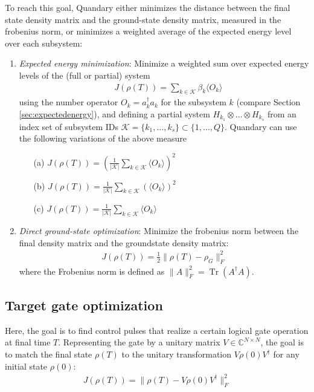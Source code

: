 \documentclass[letterpaper]{article}
\DeclareMathOperator{\Tr}{Tr}
\newcommand{\C}{\mathds{C}}
\begin{document}
To reach this goal, Quandary either minimizes the distance between the final state
density matrix and the ground-state density matrix, measured in the frobenius
norm, or minimizes a weighted average of the expected energy level over each subsystem:
\begin{enumerate}
  \item \textit{Expected energy minimization}: Minimize a weighted sum over
    expected energy levels of the (full or partial) system
    \begin{align}
       \quad J(\rho(T)) = \sum_{k\in \mathcal{K}} \beta_k \langle O_k \rangle 
    \end{align}
    using the number operator $O_k = a_k^\dag a_k$ for the subsystem $k$
    (compare Section \ref{sec:expectedenergy}), and defining a partial system
    $H_{k_1}\otimes \dots \otimes H_{k_s}$ from an index set of subsystem IDs
    $\mathcal{K}=\{k_1,\dots,k_s\}\subset \{1,\dots,Q\}$. Quandary can use the
    following variations of the above measure
    \begin{enumerate}
      \item[(a)] $J(\rho(T)) =
        \left(\frac{1}{|\mathcal{K}|}\sum_{k\in\mathcal{K}}\langle O_k \rangle
        \right)^2$
      \item[(b)] $J(\rho(T)) =
        \frac{1}{|\mathcal{K}|}\sum_{k\in\mathcal{K}}\left(\langle O_k \rangle
        \right)^2 $
      \item[(c)] $J(\rho(T)) =
        \frac{1}{|\mathcal{K}|}\sum_{k\in\mathcal{K}}\langle O_k \rangle$
    \end{enumerate}
  \item \textit{Direct ground-state optimization}: Minimize the frobenius norm
    between the final density matrix and the groundstate density matrix:
    \begin{align}
      J(\rho(T)) = \frac 12 \| \rho(T) - \rho_G \|^2_F 
    \end{align}
    where the Frobenius norm is defined as $\|A\|^2_F = \Tr(A^{\dagger}A)$.

\end{enumerate}

\subsection{Target gate optimization}

Here, the goal is to find control pulses that realize a certain logical gate
operation at final time $T$. Representing the gate by a unitary matrix $V\in
\C^{N\times N}$, the goal is to match the final state $\rho(T)$ to the unitary
transformation $V\rho(0)V^{\dagger}$ for any initial state $\rho(0)$:
\begin{align}
  J(\rho(T)) = \| \rho(T) - V\rho(0)V^{\dagger} \|^2_F 
\end{align} 
\end{document}
